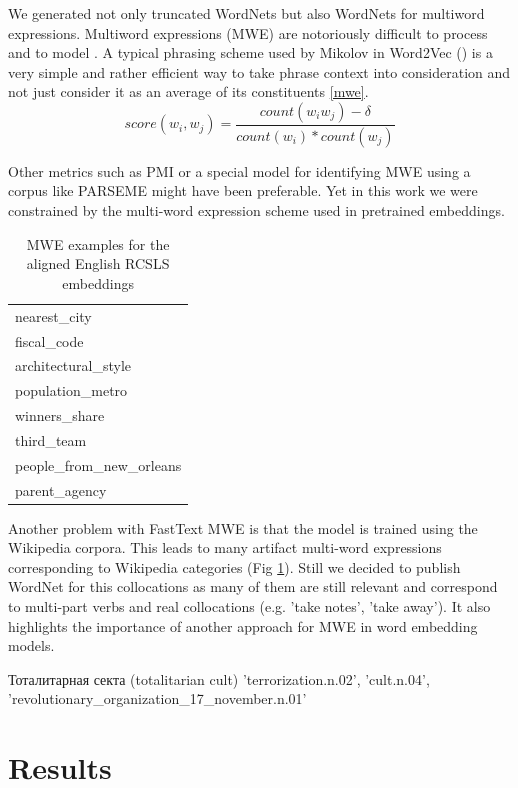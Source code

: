 \documentclass[11pt,a4paper]{article}
\begin{document}
We generated not only truncated WordNets but also WordNets for multiword expressions. Multiword expressions (MWE) are notoriously difficult to process and to model \cite{sag2002multiword}. A typical phrasing scheme used by Mikolov in Word2Vec (\citeyear{mikolov-representations-2013}) is a very simple	and rather efficient way to take phrase context into consideration and not just consider it as an average of its constituents \ref{mwe}.
$$score(w_i, w_j) = \frac{count(w_iw_j) - \delta}{count(w_i) * count(w_j)}$$

Other metrics such as PMI \cite{bouma2009normalized} or a special model for identifying MWE using a corpus like PARSEME \cite{savary2018parseme} might have been preferable. Yet in this work we were constrained by the multi-word expression scheme used in pretrained embeddings.
\begin{table}[!htbp]
	\small
	\caption{MWE examples for the aligned English RCSLS embeddings}
	\label{mwe-wiki}		
	\centering
	\begin{tabular}{|l|}
		\hline
		nearest\_city \\
		fiscal\_code \\
		architectural\_style \\
		population\_metro \\
		winners\_share \\
		third\_team \\
		people\_from\_new\_orleans \\
		parent\_agency \\
		\hline
	\end{tabular}
\end{table}

Another problem with FastText MWE is that the model is trained using the Wikipedia corpora. This leads to many artifact multi-word expressions corresponding to Wikipedia categories (Fig \ref{mwe-wiki}). Still we decided to publish WordNet for this collocations as many of them are still relevant and correspond to multi-part verbs and real collocations (e.g. 'take notes', 'take away'). It also highlights the importance of another approach for MWE in word embedding models.

Тоталитарная секта (totalitarian cult)
'terrorization.n.02',
'cult.n.04',
'revolutionary\_organization\_17\_november.n.01'

\section{Results}
\end{document}
